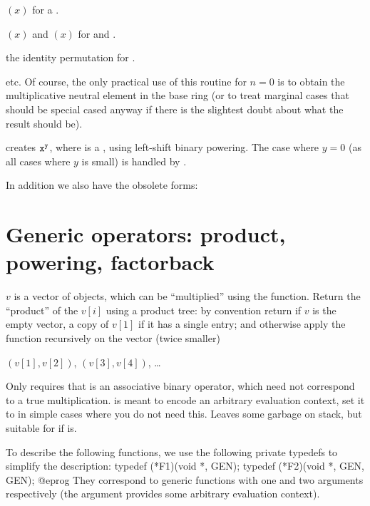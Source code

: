 \item {}$(x)$ for a .

\item {}$(x)$ and $(x)$ for  and .

\item the identity permutation for .

\item etc. Of course, the only practical use of this routine for $n = 0$ is
to obtain the multiplicative neutral element in the base ring (or to treat
marginal cases that should be special cased anyway if there is the slightest
doubt about what the result should be).

 creates ${\tt x}^{{\tt y}}$, where  is a
, using left-shift binary powering. The case where $y = 0$
(as all cases where $y$ is small) is handled by .

In addition we also have the obsolete forms:





\section{Generic operators: product, powering, factorback}

 $v$ is a vector of
objects, which can be ``multiplied'' using the  function. Return
the ``product'' of the $v[i]$ using a product tree: by convention
return  if $v$ is the empty vector, a copy of $v[1]$ if it has a
single entry; and otherwise apply the function recursively on the vector
(twice smaller)

$(v[1],v[2])$, $(v[3],v[4])$, \dots

\noindent Only requires that  is an associative binary operator,
which need not correspond to a true multiplication.  is meant to encode
an arbitrary evaluation context, set it to  in simple cases where you
do not need this. Leaves some garbage on stack, but suitable for
 if  is.

To describe the following functions, we use the following private typedefs
to simplify the description:
\bprog
  typedef (*F1)(void *, GEN);
  typedef (*F2)(void *, GEN, GEN);
@eprog
\noindent They correspond to generic functions with one and two arguments
respectively (the  argument provides some arbitrary evaluation
context).

